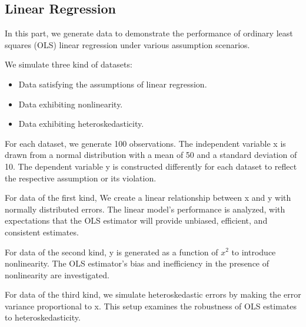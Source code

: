\documentclass[12pt]{article}
\numberwithin{figure}{section}
\begin{document}
\subsection{Linear Regression}
In this part, we generate data to demonstrate the performance of ordinary least squares (OLS) linear regression under various assumption scenarios.

We simulate three kind of datasets:
\begin{itemize}
    \item Data satisfying the assumptions of linear regression.
    \item Data exhibiting nonlinearity.
    \item Data exhibiting heteroskedasticity.
\end{itemize}

For each dataset, we generate 100 observations. The independent variable x is drawn from a normal distribution with a mean of 50 and a standard deviation of 10. The dependent variable y is constructed differently for each dataset to reflect the respective assumption or its violation.

For data of the first kind, We create a linear relationship between x and y with normally distributed errors. The linear model's performance is analyzed, with expectations that the OLS estimator will provide unbiased, efficient, and consistent estimates.


For data of the second kind, y is generated as a function of $x^2$ to introduce nonlinearity. The OLS estimator's bias and inefficiency in the presence of nonlinearity are investigated.


For data of the third kind, we simulate heteroskedastic errors by making the error variance proportional to x. This setup examines the robustness of OLS estimates to heteroskedasticity.
\end{document}
